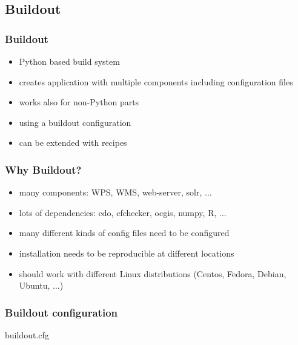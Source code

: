 \documentclass{beamer}
\begin{document}

  \subsection{Buildout}


  \begin{frame}
    \frametitle{Buildout}
    \begin{itemize}
      \item Python based build system
      \item creates application with multiple components including configuration files
      \item works also for non-Python parts
      \item using a buildout configuration 
      \item can be extended with recipes
    \end{itemize}
  \end{frame}


  \begin{frame}
    \frametitle{Why Buildout?}
    \begin{itemize}
      \item many components: WPS, WMS, web-server, solr, ...
      \item lots of dependencies: cdo, cfchecker, ocgis, numpy, R, ...
      \item many different kinds of config files need to be configured 
      \item installation needs to be reproducible at different locations
      \item should work with different Linux distributions (Centos, Fedora, Debian, Ubuntu, ...)
    \end{itemize}
  \end{frame}


  \begin{frame}[shrink]
    \frametitle{Buildout configuration}
    \begin{block}{buildout.cfg}
      
    \end{block}
\end{frame}

\end{document}
